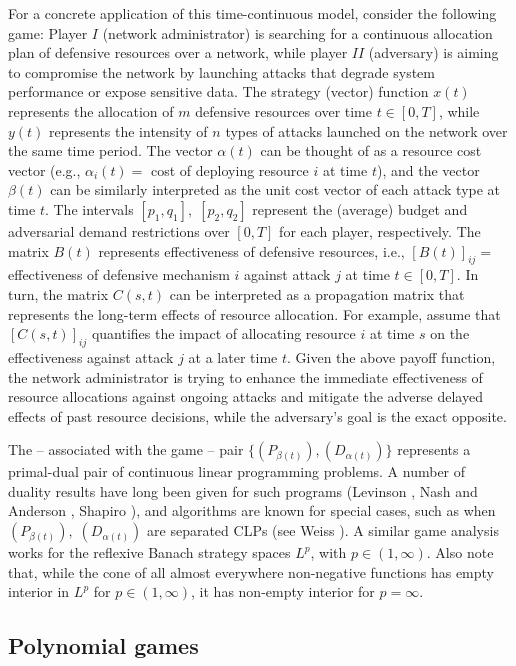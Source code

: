 \documentclass[11pt, twoside]{article}
\numberwithin{equation}{section}
\theoremstyle{definition}
\begin{document}
 For a concrete application of this time-continuous model, consider the following game: Player $I$ (network administrator) is searching for a continuous allocation plan of defensive resources over a network, while player $II$ (adversary) is aiming to compromise the network by launching attacks that degrade system performance or expose sensitive data. The strategy (vector) function $x(t)$ represents the allocation of $m$ defensive resources over time $t\in[0,T]$, while $y(t)$ represents the intensity of $n$ types of attacks launched on the network over the same time period. The vector $\alpha(t)$ can be thought of as a resource cost vector (e.g., $\alpha_i(t)=$ cost of deploying resource $i$ at time $t$), and the vector $\beta(t)$ can be similarly interpreted as the unit cost vector of each attack type at time $t$. The intervals $[p_1,q_1],\;[p_2,q_2]$ represent the (average) budget and adversarial demand restrictions over $[0,T]$ for each player, respectively. The matrix $B(t)$ represents effectiveness of defensive resources, i.e., $[B(t)]_{ij}=$ effectiveness of defensive mechanism $i$ against attack $j$ at time $t\in[0,T]$. In turn, the matrix $C(s,t)$ can be interpreted as a propagation matrix that represents the long-term effects of resource allocation. For example, assume that $[C(s,t)]_{ij}$ quantifies the impact of allocating resource 
$i$ at time $s$ on the effectiveness against attack $j$ at a later time $t$. Given the above payoff function, the network administrator is trying to enhance the immediate effectiveness of resource allocations against ongoing attacks and
mitigate the adverse delayed effects of past resource decisions, while the adversary's goal is the exact opposite.\par

 The -- associated with the game -- pair $\{(P_{\beta(t)}),(D_{\alpha(t)})\}$ represents a primal-dual pair of continuous linear programming problems. A number of duality results have long been given for such programs (Levinson \cite{levinson1966class}, Nash and Anderson \cite{nash1987linear}, Shapiro \cite{shapiro2001duality}), and algorithms are known for special cases, such as when $(P_{\beta(t)}),\;(D_{\alpha(t)})$ are separated CLPs (see Weiss \cite{weiss2008simplex}). A similar game analysis works for the reflexive Banach strategy spaces $L^p$, with $p\in(1,\infty)$. Also note that, while the cone of all almost everywhere non-negative functions has empty interior in $L^p$ for $p\in(1,\infty)$, it has non-empty interior for $p=\infty$.

\vspace{-0.1cm}\subsection{Polynomial games}\vspace{-0.2cm}
\end{document}
